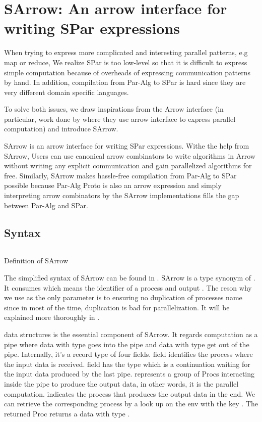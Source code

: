 \chapter{SArrow: An arrow interface for writing SPar expressions} \label{chap:arrow}
When trying to express more complicated and interesting parallel patterns, e.g map or reduce, We realize SPar is too low-level so that it is difficult to express simple computation because of overheads of expressing communication patterns by hand. In addition, compilation from Par-Alg to SPar is hard since they are very different domain specific languages. 

To solve both issues, we draw inspirations from the Arrow interface (in particular, work done by \cite{braunArrowsParallelComputation2018} where they use arrow interface to express parallel computation) and introduce SArrow.

SArrow is an arrow interface for writing SPar expressions. Withe the help from SArrow, Users can use canonical arrow combinators to write algorithms in Arrow without writing any explicit communication and gain parallelized algorithms for free. Similarly, SArrow makes hassle-free compilation from Par-Alg to SPar possible because Par-Alg Proto is also an arrow expression and simply interpreting arrow combinators by the SArrow implementations fills the gap between Par-Alg and SPar. 

\section{Syntax}
\begin{listing}[ht]
\inputminted{Haskell}{arrow/def.hs} %
\caption{Definition of SArrow}
\label{SArrow:def}
\end{listing}
The simplified syntax of SArrow can be found in . SArrow is a type synonym of . It consumes  which means the identifier of a process and output . The reson why we use  as the only parameter is to ensuring no duplication of processes name since in most of the time, duplication is bad for parallelization. It will be explained more thoroughly in .

 data structures is the essential component of SArrow. It regards computation as a pipe where data with type  goes into the pipe and data with type  get out of the pipe. Internally, it's a record type of four fields.  field identifies the process where the input data is received.  field has the type  which is a continuation waiting for the input data produced by the last pipe.  represents a group of Procs interacting inside the pipe to produce the output data, in other words, it is the parallel computation.  indicates the process that produces the output data in the end. We can retrieve the corresponding process by a look up on the env with the key . The returned Proc returns a data with type .
